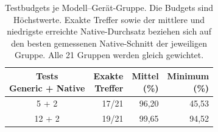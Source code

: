 \begin{table}[t]
\centering\small
\caption{Testbudgets je Modell--Gerät-Gruppe. Die Budgets sind Höchstwerte. Exakte Treffer sowie der mittlere und niedrigste erreichte Native-Durchsatz beziehen sich auf den besten gemessenen Native-Schnitt der jeweiligen Gruppe. Alle 21 Gruppen werden gleich gewichtet.}
\label{tab:staged-budget}
\setlength{\tabcolsep}{3pt}
\begin{tabular*}{\columnwidth}{@{\extracolsep{\fill}}crrr@{}}
\toprule
\shortstack{Tests\\Generic + Native} & \shortstack{Exakte\\Treffer} & \shortstack{Mittel\\(\%)} & \shortstack{Minimum\\(\%)} \\
\midrule
5 + 2 & 17/21 & 96,20 & 45,53 \\
12 + 2 & 19/21 & 99,65 & 94,52 \\
\bottomrule
\end{tabular*}
\end{table}
